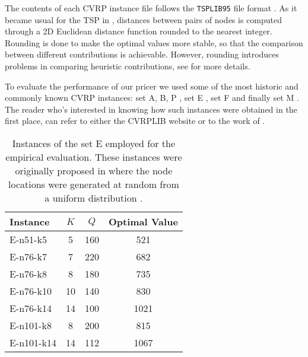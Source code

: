 The contents of each CVRP instance file follows the \texttt{TSPLIB95} file format \parencite{reinelt1995}.
As it became usual for the TSP in \textcite{reinelt1991},
distances between pairs of nodes
is computed through a 2D Euclidean distance function
rounded to the nearest integer.
Rounding is done to make the optimal values more stable, so that the comparison between different contributions is achievable.
However, rounding introduces problems in comparing heuristic contributions, see \textcite{uchoa2017} for more details.

\medskip

To evaluate the performance of our pricer we used some of the most historic
and commonly known
CVRP instances:
set A, B, P \parencite{augerat1995},
set E \parencite{dantzig1959, christofides1969, gaskell1967bases, gillett1974heuristic},
set F \parencite{fisher1994}
and finally set M \parencite{christofides1979vehicle}.
The reader who's interested in knowing how such instances were obtained in the first
place, can refer to either the CVRPLIB website or to the work of \textcite{uchoa2017}.

\begin{table*}[ht]
	\centering
	\begin{tabular}[t]{lccc}
		\toprule
		\textbf{Instance} & $K$ & $Q$ & \textbf{Optimal Value} \\
		\midrule
		E-n51-k5          & 5   & 160 & 521                    \\
		E-n76-k7          & 7   & 220 & 682                    \\
		E-n76-k8          & 8   & 180 & 735                    \\
		E-n76-k10         & 10  & 140 & 830                    \\
		E-n76-k14         & 14  & 100 & 1021                   \\
		E-n101-k8         & 8   & 200 & 815                    \\
		E-n101-k14        & 14  & 112 & 1067                   \\
		\bottomrule
	\end{tabular}
	\label{tbl:cvrp-instance-family-E}
	\caption{Instances of the set E employed for the empirical evaluation.
		These instances were originally proposed in \textcite{dantzig1959, christofides1969, gaskell1967bases, gillett1974heuristic}
		where the node locations were generated at random from a uniform distribution \parencite{uchoa2017}.
	}
\end{table*}

